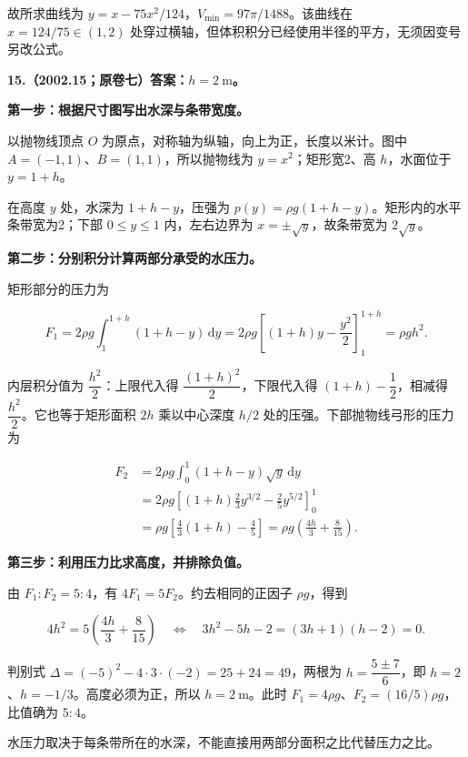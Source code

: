 \documentclass[UTF8,11pt,fontset=windows]{ctexart}
\begin{document}
故所求曲线为 $\boxed{y=x-75x^2/124}$，$\boxed{V_{\min}=97\pi/1488}$。该曲线在 $x=124/75\in(1,2)$ 处穿过横轴，但体积积分已经使用半径的平方，无须因变号另改公式。

\clearpage

\textbf{15.（2002.15；原卷七）答案：$h=2\ \mathrm m$。}

\textbf{第一步：根据尺寸图写出水深与条带宽度。}

以抛物线顶点 $O$ 为原点，对称轴为纵轴，向上为正，长度以米计。图中 $A=(-1,1)$、$B=(1,1)$，所以抛物线为 $y=x^2$；矩形宽2、高 $h$，水面位于 $y=1+h$。

在高度 $y$ 处，水深为 $1+h-y$，压强为 $p(y)=\rho g(1+h-y)$。矩形内的水平条带宽为2；下部 $0\le y\le1$ 内，左右边界为 $x=\pm\sqrt y$，故条带宽为 $2\sqrt y$。

\textbf{第二步：分别积分计算两部分承受的水压力。}

矩形部分的压力为

$$
F_1=2\rho g\int_1^{1+h}(1+h-y)\,\mathrm dy
=2\rho g\left[(1+h)y-\frac{y^2}{2}\right]_1^{1+h}
=\rho g h^2.
$$

内层积分值为 $\dfrac{h^2}{2}$：上限代入得 $\dfrac{(1+h)^2}{2}$，下限代入得 $(1+h)-\dfrac12$，相减得 $\dfrac{h^2}{2}$。它也等于矩形面积 $2h$ 乘以中心深度 $h/2$ 处的压强。下部抛物线弓形的压力为

$$
\begin{aligned}
F_2&=2\rho g\int_0^1(1+h-y)\sqrt y\,\mathrm dy\\
&=2\rho g\left[(1+h)\frac23y^{3/2}-\frac25y^{5/2}\right]_0^1\\
&=\rho g\left[\frac43(1+h)-\frac45\right]
=\rho g\left(\frac{4h}{3}+\frac8{15}\right).
\end{aligned}
$$

\textbf{第三步：利用压力比求高度，并排除负值。}

由 $F_1:F_2=5:4$，有 $4F_1=5F_2$。约去相同的正因子 $\rho g$，得到

$$
4h^2=5\left(\frac{4h}{3}+\frac8{15}\right)
\quad\Longleftrightarrow\quad
3h^2-5h-2=(3h+1)(h-2)=0.
$$

判别式 $\Delta=(-5)^2-4\cdot3\cdot(-2)=25+24=49$，两根为 $h=\dfrac{5\pm7}{6}$，即 $h=2$、$h=-1/3$。高度必须为正，所以 $\boxed{h=2\ \mathrm m}$。此时 $F_1=4\rho g$、$F_2=(16/5)\rho g$，比值确为 $5:4$。

水压力取决于每条带所在的水深，不能直接用两部分面积之比代替压力之比。

\clearpage
\end{document}
